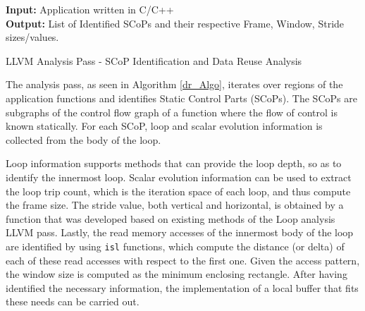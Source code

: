 \documentclass[]{usiinfthesis}
\begin{document}
\begin{algorithm}[t]
\begin{flushleft}
\textbf{Input:}  Application written in C/C++\\
\textbf{Output:} List of Identified SCoPs and their respective Frame, Window, Stride sizes/values.\\
\end{flushleft}
\begin{algorithmic}[1]
  \State{}
  \State{}
  \State{}
\EndFunction
\State
{}
  \State{}
  \State{}
    \State{}
    \State{}
    \State{}
    \State{}
    \State{}
  \EndIf
\EndFunction
\end{algorithmic}
\caption{LLVM Analysis Pass - SCoP Identification and 
Data Reuse Analysis}
\label{dr_Algo}
\end{algorithm}


The analysis pass, as seen in Algorithm  \ref{dr_Algo}, 
iterates over regions of the application 
functions and identifies Static Control Parts (SCoPs). The SCoPs are subgraphs of the control 
flow graph of a function 
where the flow of control is known statically. For each SCoP, loop and scalar evolution information
is collected from the body of the loop. \par

Loop information supports methods that can provide the 
loop depth, so as to identify the innermost loop. Scalar evolution information can be used to extract 
the loop trip count, which is the iteration space of each loop, and thus compute the frame size.
The stride value, both vertical and horizontal, is obtained by a function that was developed based
on existing methods of the Loop analysis LLVM pass.
Lastly, the read memory accesses of the innermost body of
the loop are identified by using \texttt{isl} functions, which
compute the
distance (or delta) of each of these read accesses with respect to the
first one. Given the access pattern, the window size is computed as the minimum 
enclosing rectangle. After having identified the necessary information, the implementation of a
local buffer that fits these needs can be carried out. 
\par
\end{document}
